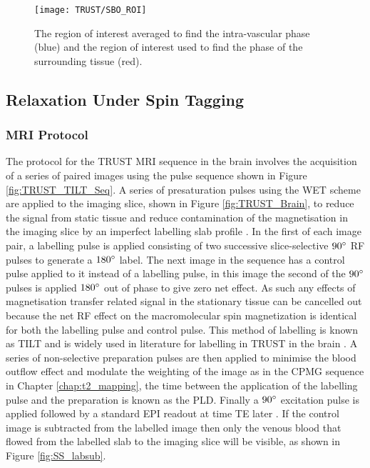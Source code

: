 \begin{figure}[H]
	\centering
	\texttt{[image: TRUST/SBO\_ROI]}
	\caption{The region of interest averaged to find the intra-vascular phase (blue) and the region of interest used to find the phase of the surrounding tissue (red).}
	\label{fig:SBO_ROI}	
\end{figure}


\subsection{\ttwo Relaxation Under Spin Tagging}

\subsubsection{\ac{MRI} Protocol}
\label{sec:TRUST_MRI}

The protocol for the \ac{TRUST} \ac{MRI} sequence in the brain involves the acquisition of a series of paired images using the pulse sequence shown in Figure \ref{fig:TRUST_TILT_Seq}. A series of presaturation pulses using the \ac{WET} scheme are applied to the imaging slice, shown in Figure \ref{fig:TRUST_Brain}, to reduce the signal from static tissue and reduce contamination of the magnetisation in the imaging slice by an imperfect labelling slab profile \cite{hendrikse_measurements_2003, golay_pulsed_2005}. In the first of each image pair, a labelling pulse is applied consisting of two successive slice-selective $90\degree$ \ac{RF} pulses to generate a $180\degree$ label. The next image in the sequence has a control pulse applied to it instead of a labelling pulse, in this image the second of the $90\degree$ pulses is applied $180\degree$ out of phase to give zero net effect. As such any effects of magnetisation transfer related signal in the stationary tissue can be cancelled out because the net \ac{RF} effect on the macromolecular spin magnetization is identical for both the labelling pulse and control pulse. This method of labelling is known as \ac{TILT} and is widely used in literature for labelling in \ac{TRUST} in the brain \cite{golay_transfer_1999}. A series of non-selective \ttwo preparation pulses are then applied to minimise the blood outflow effect and modulate the \ttwo weighting of the image as in the \ac{CPMG} sequence in Chapter \ref{chap:t2_mapping}, the time between the application of the labelling pulse and the \ttwo preparation is known as the \ac{PLD}. Finally a $90\degree$ excitation pulse is applied followed by a standard \ac{EPI} readout at time \ac{TE} later \cite{xu_improving_2012}. If the control image is subtracted from the labelled image then only the venous blood that flowed from the labelled slab to the imaging slice will be visible, as shown in Figure \ref{fig:SS_labsub}.

